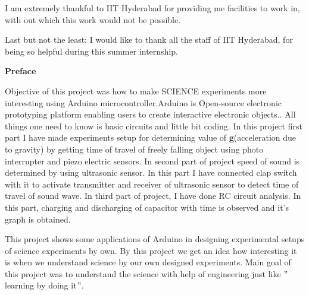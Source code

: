 \documentclass[12pt]{article}
\begin{document}
\vspace{\baselineskip}
{\fontsize{17.28pt}{19.2pt}\selectfont I am extremely thankful to IIT Hyderabad for providing me facilities to work in, with out which this work would not be possible.\par}\par


\vspace{\baselineskip}
{\fontsize{17.28pt}{19.2pt}\selectfont Last but not the least; I would like to thank all the staff of IIT Hyderabad, for being so helpful during this summer internship.\par}\par


\vspace{\baselineskip}
{\fontsize{17.28pt}{19.2pt}\selectfont  \par}


\newpage
\par

{\fontsize{17.28pt}{19.2pt}\selectfont \textbf{Preface}\par}\par


\vspace{\baselineskip}
{\fontsize{17.28pt}{19.2pt}\selectfont   Objective of this project was how to make SCIENCE experiments more interesting using Arduino microcontroller.Arduino is Open-source electronic prototyping platform enabling users to create interactive electronic objects.. All things one need to know is basic circuits and little bit coding. In this project first part I have made experiments setup for determining value of \textbf{g}(acceleration due to gravity) by getting time of travel of freely falling object using photo interrupter and piezo electric sensors. In second part of project speed of sound is determined by using ultrasonic sensor. In this part I have connected clap switch with it to activate transmitter and receiver of ultrasonic sensor to detect time of travel of sound wave. In third part of project, I have done RC circuit analysis. In this part, charging and discharging of capacitor with time is observed and it’s graph is obtained. \par}\par


\vspace{\baselineskip}
{\fontsize{17.28pt}{19.2pt}\selectfont This project shows some applications of Arduino in designing experimental setups of science experiments by own. By this project we get an idea how interesting it is when we understand science by our own designed experiments. Main goal of this project was to understand the science with help of engineering just like $"$learning by doing it$"$.\par}\par
\end{document}
